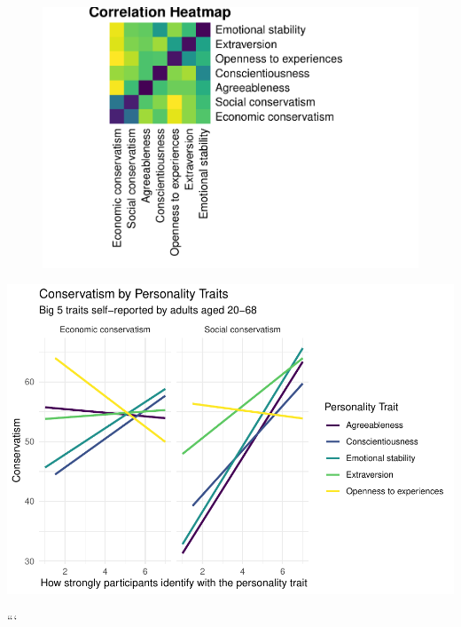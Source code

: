 \documentclass[man]{apa6}
\begin{document}
\begin{figure}
\centering
\includegraphics{manuscript_files/figure-latex/correlations-1.pdf}
\caption{}
\end{figure}

\includegraphics{manuscript_files/figure-latex/figure1-1.pdf}

```

\endgroup
\end{document}
